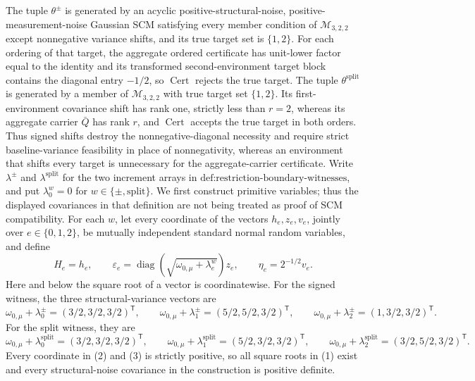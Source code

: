 The tuple \(\theta^{\pm}\) is generated by an acyclic positive-structural-noise, positive-measurement-noise Gaussian SCM satisfying every member condition of \(\mathcal M_{3,2,2}\) except nonnegative variance shifts, and its true target set is \(\{1,2\}\).  For each ordering of that target, the aggregate ordered certificate has unit-lower factor equal to the identity and its transformed second-environment target block contains the diagonal entry \(-1/2\), so \(\operatorname{Cert}\) rejects the true target.  The tuple \(\theta^{\mathrm{split}}\) is generated by a member of \(\mathcal M_{3,2,2}\) with true target set \(\{1,2\}\).  Its first-environment covariance shift has rank one, strictly less than \(r=2\), whereas its aggregate carrier \(\bar Q\) has rank \(r\), and \(\operatorname{Cert}\) accepts the true target in both orders.  Thus signed shifts destroy the nonnegative-diagonal necessity and require strict baseline-variance feasibility in place of nonnegativity, whereas an environment that shifts every target is unnecessary for the aggregate-carrier certificate.
Write \(\lambda^{\pm}\) and \(\lambda^{\mathrm{split}}\) for the two increment arrays in \(\text{def:restriction-boundary-witnesses}\), and put \(\lambda^w_0=0\) for \(w\in\{\pm,\mathrm{split}\}\).  We first construct primitive variables; thus the displayed covariances in that definition are not being treated as proof of SCM compatibility.  For each \(w\), let every coordinate of the vectors \(h_e,z_e,v_e\), jointly over \(e\in\{0,1,2\}\), be mutually independent standard normal random variables, and define
\[
 H_e=h_e,\qquad
 \varepsilon_e=\operatorname{diag}\!\left(\sqrt{\omega_{0,\mu}+\lambda^w_e}\right)z_e,
 \qquad
 \eta_e=2^{-1/2}v_e. \tag{1}
\]
Here and below the square root of a vector is coordinatewise.  For the signed witness, the three structural-variance vectors are
\[
 \omega_{0,\mu}+\lambda^{\pm}_0=(3/2,3/2,3/2)^{\mathsf T},\qquad
 \omega_{0,\mu}+\lambda^{\pm}_1=(5/2,5/2,3/2)^{\mathsf T},\qquad
 \omega_{0,\mu}+\lambda^{\pm}_2=(1,3/2,3/2)^{\mathsf T}. \tag{2}
\]
For the split witness, they are
\[
 \omega_{0,\mu}+\lambda^{\mathrm{split}}_0=(3/2,3/2,3/2)^{\mathsf T},\qquad
 \omega_{0,\mu}+\lambda^{\mathrm{split}}_1=(5/2,3/2,3/2)^{\mathsf T},\qquad
 \omega_{0,\mu}+\lambda^{\mathrm{split}}_2=(3/2,5/2,3/2)^{\mathsf T}. \tag{3}
\]
Every coordinate in (2) and (3) is strictly positive, so all square roots in (1) exist and every structural-noise covariance in the construction is positive definite.

